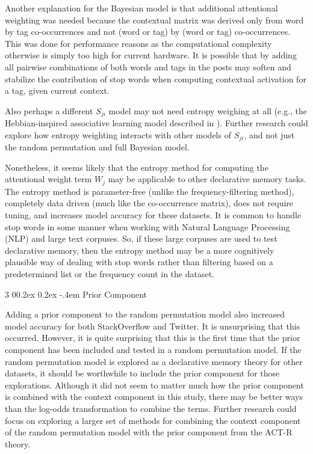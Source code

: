 \documentclass[man,floatsintext,donotrepeattitle]{apa6}
\makeatletter
\renewcommand{\subsubsection}{%
  \@startsection
  {subsubsection}%
  {3}%
  {\parindent}%
  {0\baselineskip \@plus 0.2ex \@minus 0.2ex}%
  {-.4em}%
  {\normalfont\normalsize\bfseries\addperi}}
\makeatother
\begin{document}
Another explanation for the Bayesian model is that additional attentional weighting was needed because the contextual matrix was derived only from word by tag co-occurrences and not (word or tag) by (word or tag) co-occurrences.
This was done for performance reasons as the computational complexity otherwise is simply too high for current hardware.
It is possible that by adding all pairwise combinations of both words and tags in the posts may soften and stabilize the contribution of stop words when computing contextual activation for a tag, given current context.

Also perhaps a different $S_{ji}$ model may not need entropy weighing at all (e.g., the Hebbian-inspired associative learning model described in ).
Further research could explore how entropy weighting interacts with other models of $S_{ji}$, and not just the random permutation and full Bayesian model.

Nonetheless, it seems likely that the entropy method for computing the attentional weight term $W_{j}$ may be applicable to other declarative memory tasks.
The entropy method is parameter-free (unlike the frequency-filtering method), completely data driven (much like the co-occurrence matrix), does not require tuning,
and increases model accuracy for these datasets.
It is common to handle stop words in some manner when working with Natural Language Processing (NLP) and large text corpuses.
So, if these large corpuses are used to test declarative memory,
then the entropy method may be a more cognitively plausible way of dealing with stop words rather than filtering based on a predetermined list or the frequency count in the dataset.

\subsubsection{Prior Component}

Adding a prior component to the random permutation model also increased model accuracy for both StackOverflow and Twitter.
It is unsurprising that this occurred.
However, it is quite surprising that this is the first time that the prior component has been included and tested in a random permutation model.
If the random permutation model is explored as a declarative memory theory for other datasets, it should be worthwhile to include the prior component for those explorations.
Although it did not seem to matter much how the prior component is combined with the context component in this study, 
there may be better ways than the log-odds transformation to combine the terms.
Further research could focus on exploring a larger set of methods for combining the context component of the random permutation model with the prior component from the ACT-R theory.
\end{document}
